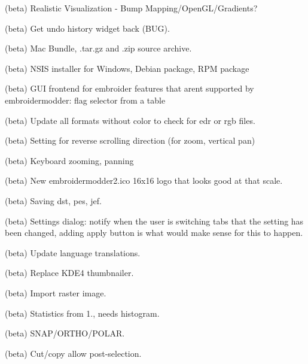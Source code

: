 \begin{DoxyRefList}
\label{todo__todo000342}%
%
(beta) Realistic Visualization -\/ Bump Mapping/\+Open\+GL/\+Gradients?

\label{todo__todo000343}%
%
(beta) Get undo history widget back (BUG).

\label{todo__todo000344}%
%
(beta) Mac Bundle, .tar.\+gz and .zip source archive.

\label{todo__todo000345}%
%
(beta) NSIS installer for Windows, Debian package, RPM package

\label{todo__todo000346}%
%
(beta) GUI frontend for embroider features that aren\textquotesingle{}t supported by embroidermodder\+: flag selector from a table

\label{todo__todo000347}%
%
(beta) Update all formats without color to check for edr or rgb files.

\label{todo__todo000348}%
%
(beta) Setting for reverse scrolling direction (for zoom, vertical pan)

\label{todo__todo000349}%
%
(beta) Keyboard zooming, panning

\label{todo__todo000350}%
%
(beta) New embroidermodder2.\+ico 16x16 logo that looks good at that scale.

\label{todo__todo000351}%
%
(beta) Saving dst, pes, jef.

\label{todo__todo000352}%
%
(beta) Settings dialog\+: notify when the user is switching tabs that the setting has been changed, adding apply button is what would make sense for this to happen.

\label{todo__todo000353}%
%
(beta) Update language translations.

\label{todo__todo000354}%
%
(beta) Replace KDE4 thumbnailer.

\label{todo__todo000355}%
%
(beta) Import raster image.

\label{todo__todo000356}%
%
(beta) Statistics from 1., needs histogram.

\label{todo__todo000357}%
%
(beta) SNAP/\+ORTHO/\+POLAR.

\label{todo__todo000358}%
%
(beta) Cut/copy allow post-\/selection.


\end{DoxyRefList}
